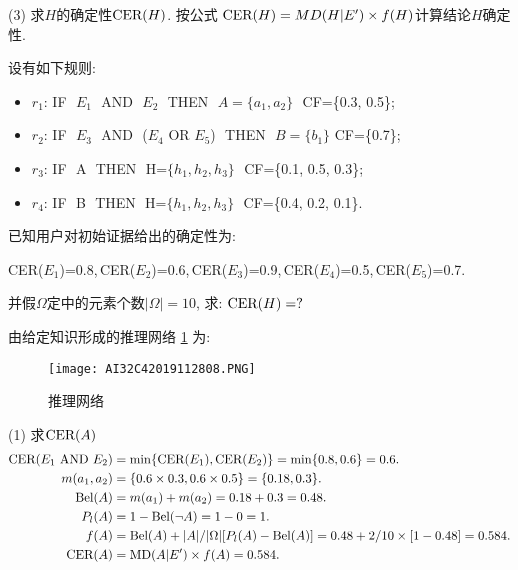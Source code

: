 (3) 求$H$的确定性$\textup{CER}(H)$. 按公式 $\textup{CER}(H)=MD(H|E') \times f(H)$计算结论$H$确定性.
\begin{example}
设有如下规则:
\begin{itemize}
    \item $r_1$:  IF\,\,  $E_1$\,\,  AND\,\,  $E_2$\,\,  THEN\,\,  $A=\{a_1, a_2\}$\,\,  \textup{CF}=\{0.3,  0.5\};
    \item $r_2$:  IF\,\,  $E_3$\,\,  AND\,\, ($E_4$  OR  $E_5$)\,\,  THEN\,\,  $B=\{b_1\}$  \textup{CF}=\{0.7\};
    \item $r_3$:  IF\,\,  A\,\,  THEN\,\,  H=$\{h_1, h_2, h_3\}$\,\,  \textup{CF}=\{0.1, 0.5, 0.3\};
    \item $r_4$:  IF\,\,  B\,\,  THEN\,\,  H=$\{h_1, h_2, h_3\}$\,\,  \textup{CF}=\{0.4, 0.2, 0.1\}.
\end{itemize}

已知用户对初始证据给出的确定性为:
\begin{center}
    \textup{CER}($E_1$)=0.8,\,\textup{CER}($E_2$)=0.6,\,\textup{CER}($E_3$)=0.9,\,\textup{CER}($E_4$)=0.5,\,\textup{CER}($E_5$)=0.7.
\end{center}
并假$\Omega$定中的元素个数$|\Omega|=10$, 求: $\textup{CER}(H)=?$
\end{example}
\begin{result}
    由给定知识形成的推理网络 \ref{AI32fig2808} 为:
\begin{figure}[H]
    \centering
    \texttt{[image: AI32C42019112808.PNG]}
    \caption{推理网络}
    \label{AI32fig2808}
\end{figure}
\end{result}

(1) 求$\textup{CER}(A)$
\begin{align*}
 \textup{CER}(E_1\,\, \textup{AND}\,\,  E_2)&=\min\{\textup{CER}(E_1), \textup{CER}(E_2)\}=\min\{0.8,  0.6\}=0.6.\\
   m({a_1}, {a_2})&=\{0.6\times 0.3, 0.6\times 0.5\}=\{0.18, 0.3\}.\\
   \textup{Bel}(A)&=m({a_1})+m({a_2})=0.18+0.3=0.48.\\
   P_l(A)&=1-\textup{Bel}(\neg A)=1-0=1.\\
   f(A)&=\textup{Bel}(A)+|A|/|\Omega| [P_l(A)-\textup{Bel}(A)]=0.48+2/10\times [1-0.48] =0.584.\\
  \textup{CER}(A)&=\textup{MD}(A|E')\times f(A)=0.584.
\end{align*}

